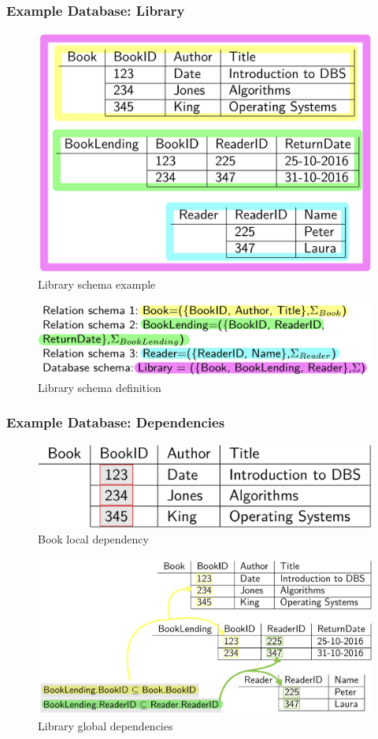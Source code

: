 \newpage
\subsubsection{Example Database: Library}
\begin{figure}[!hbp]
    \centering
    \includegraphics[width=0.60\linewidth]{images/AdvancedDataManagment/rdbms/library_schema_1.jpeg}
    \caption{Library schema example}
\end{figure}

\begin{figure}[!hbp]
    \centering
    \includegraphics[width=0.70\linewidth]{images/AdvancedDataManagment/rdbms/library_schema2.jpeg}
    \caption{Library schema definition}
\end{figure}

\subsubsection{Example Database: Dependencies}
\begin{figure}[!hbp]
    \centering
    \includegraphics[width=0.50\linewidth]{images/AdvancedDataManagment/rdbms/local_dependencies.jpeg}
    \caption{Book local dependency}
\end{figure}

\begin{figure}[!hbp]
    \centering
    \includegraphics[width=0.70\linewidth]{images/AdvancedDataManagment/rdbms/global_dependencies.jpeg}
    \caption{Library global dependencies}
\end{figure}

